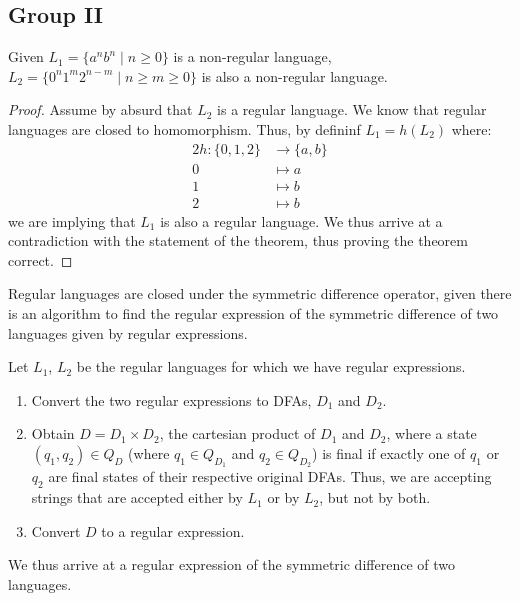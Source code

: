 \documentclass[docid=2018/19]{tcom_exam}
\begin{document}
{\subsection{Group II}
\begin{theorem}
	Given $L_1=\{a^n b^n \mid n \geq 0\}$ is a non-regular language, $L_2=\{0^n 1^m 2^{n-m} \mid  n \geq m \geq 0\}$ is also a non-regular language.
\end{theorem}
\begin{proof}
	Assume by absurd that $L_2$ is a regular language. We know that regular languages are closed to homomorphism. Thus, by defininf $L_1=h(L_2)$ where:
	\begin{alignat*}{2}
		h \colon \{0,1,2\} &\rightarrow \{a,b\}\\
		0                  &\mapsto a\\
		1                  &\mapsto b\\
		2                  &\mapsto b
	\end{alignat*}
	we are implying that $L_1$ is also a regular language. We thus arrive at a contradiction with the statement of the theorem, thus proving the theorem correct.
\end{proof}
Regular languages are closed under the symmetric difference operator, given there is an algorithm to find the regular expression of the symmetric difference of two languages given by regular expressions.\par
Let $L_1$, $L_2$ be the regular languages for which we have regular expressions.
\begin{enumerate}
	\item Convert the two regular expressions to DFAs, $D_1$ and $D_2$.
	\item Obtain $D=D_1 \times D_2$, the cartesian product of $D_1$ and $D_2$, where a state $(q_1,q_2)\in Q_D$ (where $q_1 \in Q_{D_1}$ and $q_2 \in Q_{D_2}$) is final if exactly one of $q_1$ or $q_2$ are final states of their respective original DFAs. Thus, we are accepting strings that are accepted either by $L_1$ or by $L_2$, but not by both.
	\item Convert $D$ to a regular expression.
\end{enumerate}
We thus arrive at a regular expression of the symmetric difference of two languages.
\pagebreak
}
\end{document}
